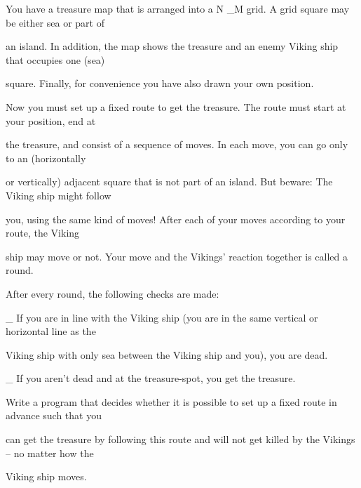 You have a treasure map that is arranged into a N \_M grid. A grid square may be either sea or part of

an island. In addition, the map shows the treasure and an enemy Viking ship that occupies one (sea)

square. Finally, for convenience you have also drawn your own position.

Now you must set up a fixed route to get the treasure. The route must start at your position, end at

the treasure, and consist of a sequence of moves. In each move, you can go only to an (horizontally

or vertically) adjacent square that is not part of an island. But beware: The Viking ship might follow

you, using the same kind of moves! After each of your moves according to your route, the Viking

ship may move or not. Your move and the Vikings’ reaction together is called a round.

After every round, the following checks are made:

\_ If you are in line with the Viking ship (you are in the same vertical or horizontal line as the

Viking ship with only sea between the Viking ship and you), you are dead.

\_ If you aren’t dead and at the treasure-spot, you get the treasure.

Write a program that decides whether it is possible to set up a fixed route in advance such that you

can get the treasure by following this route and will not get killed by the Vikings – no matter how the

Viking ship moves.

\